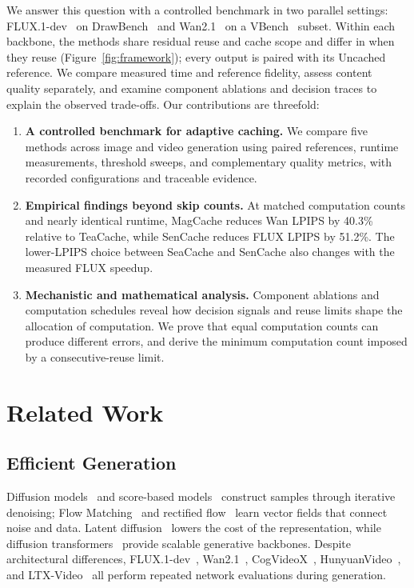 \documentclass[10pt,twocolumn,letterpaper]{article}
\begin{document}
We answer this question with a controlled benchmark in two parallel settings: \mbox{FLUX.1-dev}~\cite{flux2024} on DrawBench~\cite{saharia2022imagen} and Wan2.1~\cite{wan2025wan} on a VBench~\cite{huang2024vbench} subset.
Within each backbone, the methods share residual reuse and cache scope and differ in when they reuse (Figure~\ref{fig:framework}); every output is paired with its Uncached reference.
We compare measured time and reference fidelity, assess content quality separately, and examine component ablations and decision traces to explain the observed trade-offs.
Our contributions are threefold:
\begin{enumerate}[label=(\arabic*),topsep=3pt,itemsep=3pt]
\item \textbf{A controlled benchmark for adaptive caching.}
We compare five methods across image and video generation using paired references, runtime measurements, threshold sweeps, and complementary quality metrics, with recorded configurations and traceable evidence.
\item \textbf{Empirical findings beyond skip counts.}
At matched computation counts and nearly identical runtime, MagCache reduces Wan LPIPS by 40.3\% relative to TeaCache, while SenCache reduces FLUX LPIPS by 51.2\%.
The lower-LPIPS choice between SeaCache and SenCache also changes with the measured FLUX speedup.
\item \textbf{Mechanistic and mathematical analysis.}
Component ablations and computation schedules reveal how decision signals and reuse limits shape the allocation of computation.
We prove that equal computation counts can produce different errors, and derive the minimum computation count imposed by a consecutive-reuse limit.
\end{enumerate}

\section{Related Work}
\label{sec:related}
\subsection{Efficient Generation}
Diffusion models~\cite{ho2020ddpm} and score-based models~\cite{song2021sde} construct samples through iterative denoising; Flow Matching~\cite{lipman2023flowmatching} and rectified flow~\cite{liu2023rectifiedflow} learn vector fields that connect noise and data.
Latent diffusion~\cite{rombach2022ldm} lowers the cost of the representation, while diffusion transformers~\cite{peebles2023dit} provide scalable generative backbones.
Despite architectural differences, \mbox{FLUX.1-dev}~\cite{flux2024}, Wan2.1~\cite{wan2025wan}, CogVideoX~\cite{yang2025cogvideox}, HunyuanVideo~\cite{kong2024hunyuanvideo}, and \mbox{LTX-Video}~\cite{hacohen2024ltxvideo} all perform repeated network evaluations during generation.
\end{document}
